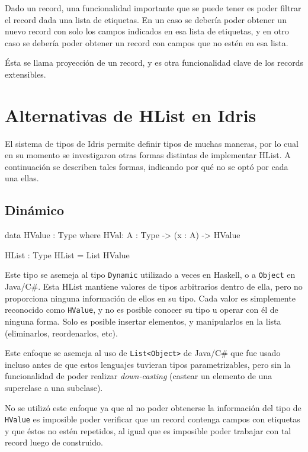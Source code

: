 \begin{code}
\begin{code}
{Dado un record, una funcionalidad importante que se puede tener es poder filtrar el record dada una lista de etiquetas. En un caso se debería poder obtener un nuevo record con solo los campos indicados en esa lista de etiquetas, y en otro caso se debería poder obtener un record con campos que no estén en esa lista.

Ésta se llama proyección de un record, y es otra funcionalidad clave de los records extensibles.




\section{Alternativas de HList en Idris}

El sistema de tipos de Idris permite definir tipos de muchas maneras, por lo cual en su momento se investigaron otras formas distintas de implementar HList.
A continuación se describen tales formas, indicando por qué no se optó por cada una ellas.

\subsection{Dinámico}

\begin{code}
data HValue : Type where
    HVal: {A : Type} -> (x : A) -> HValue

HList : Type
HList = List HValue 
\end{code}

Este tipo se asemeja al tipo \texttt{Dynamic} utilizado a veces en Haskell, o a \texttt{Object} en Java/C\#. Esta HList mantiene valores de tipos arbitrarios dentro de ella, pero no proporciona ninguna información de ellos en su tipo. Cada valor es simplemente reconocido como \texttt{HValue}, y no es posible conocer su tipo u operar con él de ninguna forma. Solo es posible insertar elementos, y manipularlos en la lista (eliminarlos, reordenarlos, etc).

Este enfoque se asemeja al uso de \texttt{List<Object>} de Java/C\# que fue usado incluso antes de que estos lenguajes tuvieran tipos parametrizables, pero sin la funcionalidad de poder realizar \textit{down-casting} (castear un elemento de una superclase a una subclase).

No se utilizó este enfoque ya que al no poder obtenerse la información del tipo de \texttt{HValue} es imposible poder verificar que un record contenga campos con etiquetas y que éstos no estén repetidos, al igual que es imposible poder trabajar con tal record luego de construido.

}
\end{code}
\end{code}
